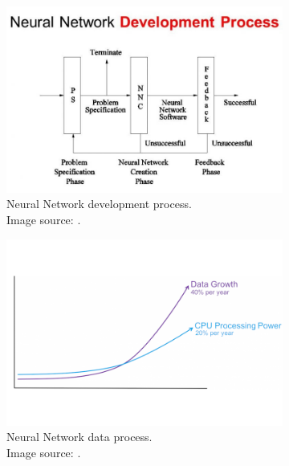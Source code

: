 \begin{figure}
\begin{subfigure}{.5\linewidth}
	\centering
	\includegraphics[width=\textwidth]{figures/Magistrale/02 - neural-networks-development-process}
	\caption{Neural Network development process. \\Image source: \cite{img02}.
	\label{fig:nn_development_process}}
\end{subfigure}%
\begin{subfigure}{.5\linewidth}
	\centering
	\includegraphics[width=\textwidth]{figures/Magistrale/03 - neural-networks-data-process}
	\caption{Neural Network data process. \\Image source: \cite{img03}.
	\label{fig:nn_data_process}}
\end{subfigure}\\[5ex]
\begin{subfigure}{\linewidth}

\end{subfigure}
\end{figure}
